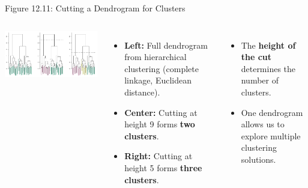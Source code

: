 \documentclass[aspectratio=169,xcolor=dvipsnames]{beamer}
\begin{document}
\begin{frame}{Figure 12.11: Cutting a Dendrogram for Clusters}
  \begin{columns}
    \includegraphics[width=\linewidth]{images/figure12_11.png} %

    \begin{itemize}
      \item \textbf{Left:} Full dendrogram from hierarchical clustering (complete linkage, Euclidean distance).
      \item \textbf{Center:} Cutting at height 9 forms \textbf{two clusters}.
      \item \textbf{Right:} Cutting at height 5 forms \textbf{three clusters}.
    \end{itemize}

    \vspace{0.2cm}

    \begin{itemize}
      \item The \textbf{height of the cut} determines the number of clusters.
      \item One dendrogram allows us to explore multiple clustering solutions.
    \end{itemize}
  \end{columns}

\end{frame}
\end{document}
